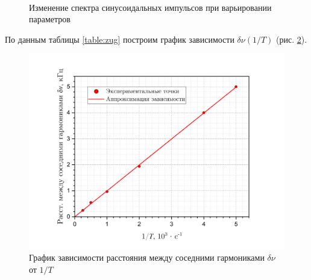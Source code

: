 \documentclass[a4paper, 12pt]{article}
\begin{document}
\begin{figure}[H]
         \\
        \caption{Изменение спектра синусоидальных импульсов при варьировании параметров}
        \label{spectrum_B}
    \end{figure}

    По данным таблицы \ref{table:zug} построим график зависимости $\delta \nu \left( 1/T \right)$ (рис. \ref{graph:zug}).

    \begin{figure}[H]
        \centering
        \includegraphics[width = 14 cm]{images/graph_zug.png}
        \caption{График зависимости расстояния между соседними гармониками $\delta \nu$ от $1/T$}
        \label{graph:zug}
    \end{figure}
\end{document}
